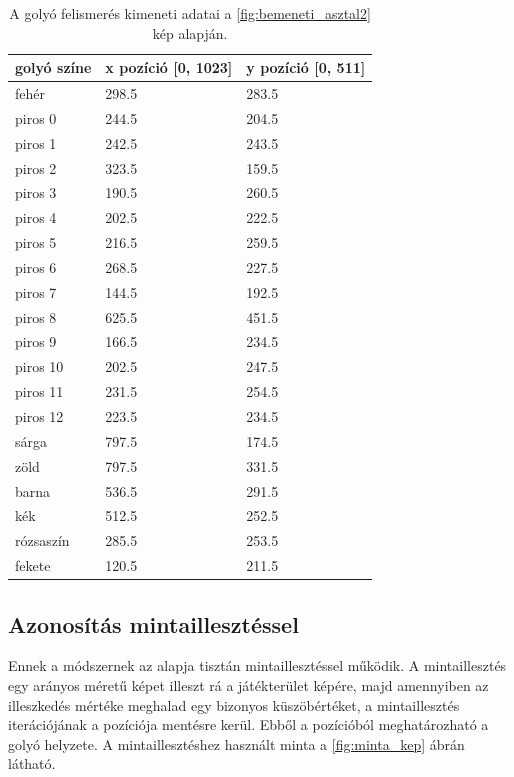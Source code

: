 \begin{table}[!ht]
    \caption{A golyó felismerés kimeneti adatai a \ref{fig:bemeneti_asztal2} kép alapján.}
    \label{tab:felismert_koordinatak}
	\footnotesize
	\centering
	\begin{tabular}{ l l l }
		\toprule
		golyó színe & x pozíció [0, 1023] & y pozíció [0, 511] \\
		\midrule
        fehér     & 298.5 & 283.5\\
        piros 0   & 244.5 & 204.5\\
        piros 1   & 242.5 & 243.5\\
        piros 2   & 323.5 & 159.5\\
        piros 3   & 190.5 & 260.5\\
        piros 4   & 202.5 & 222.5\\
        piros 5   & 216.5 & 259.5\\
        piros 6   & 268.5 & 227.5\\
        piros 7   & 144.5 & 192.5\\
        piros 8   & 625.5 & 451.5\\
        piros 9   & 166.5 & 234.5\\
        piros 10  & 202.5 & 247.5\\
        piros 11  & 231.5 & 254.5\\
        piros 12  & 223.5 & 234.5\\
        sárga     & 797.5 & 174.5\\
        zöld      & 797.5 & 331.5\\
        barna     & 536.5 & 291.5\\
        kék       & 512.5 & 252.5\\
        rózsaszín & 285.5 & 253.5\\
        fekete    & 120.5 & 211.5\\
		\bottomrule
	\end{tabular}
\end{table}

\subsection{Azonosítás mintaillesztéssel}
Ennek a módszernek az alapja tisztán mintaillesztéssel működik. A mintaillesztés egy arányos méretű képet illeszt rá a játékterület képére, majd amennyiben az illeszkedés mértéke meghalad egy bizonyos küszöbértéket, a mintaillesztés iterációjának a pozíciója mentésre kerül. Ebből a pozícióból meghatározható a golyó helyzete. A mintaillesztéshez használt minta a \ref{fig:minta_kep} ábrán látható.

